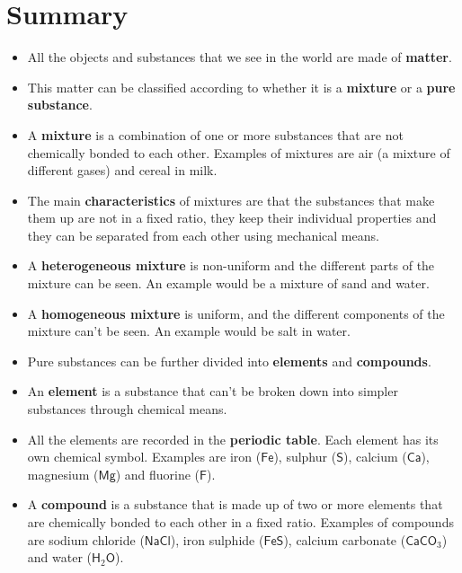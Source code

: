             \section{Summary}
            \nopagebreak
      \label{m38706*id67458}\begin{itemize}[noitemsep]
            \label{m38706*uid114}\item All the objects and substances that we see in the world are made of \textbf{matter}.
\label{m38706*uid115}\item This matter can be classified according to whether it is a \textbf{mixture} or a \textbf{pure substance}.
\label{m38706*uid116}\item A \textbf{mixture} is a combination of one or more substances that are not chemically bonded to each other. Examples of mixtures are air (a mixture of different gases) and cereal in milk.
\label{m38706*uid117}\item The main \textbf{characteristics} of mixtures are that the substances that make them up are not in a fixed ratio, they keep their individual properties and they can be separated from each other using mechanical means.
\label{m38706*uid118}\item A \textbf{heterogeneous mixture} is non-uniform and the different parts of the mixture can be seen. An example would be a mixture of sand and water.
\label{m38706*uid119}\item A \textbf{homogeneous mixture} is uniform, and the different components of the mixture can't be seen. An example would be salt in water.
\label{m38706*uid121}\item Pure substances can be further divided into \textbf{elements} and \textbf{compounds}.
\label{m38706*uid122}\item An \textbf{element} is a substance that can't be broken down into simpler substances through chemical means.
\label{m38706*uid123}\item All the elements are recorded in the \textbf{periodic table}. Each element has its own chemical symbol. Examples are iron ($\mathsf{Fe}$), sulphur ($\mathsf{S}$), calcium ($\mathsf{Ca}$), magnesium ($\mathsf{Mg}$) and fluorine ($\mathsf{F}$).
\label{m38706*uid124}\item A \textbf{compound} is a substance that is made up of two or more elements that are chemically bonded to each other in a fixed ratio. Examples of compounds are sodium chloride ($\mathsf{NaCl}$), iron sulphide ($\mathsf{FeS}$), calcium carbonate (${\mathsf{CaCO}}_{3}$) and water (${\mathsf{H}}_{2}\mathsf{O}$).

\end{itemize}
